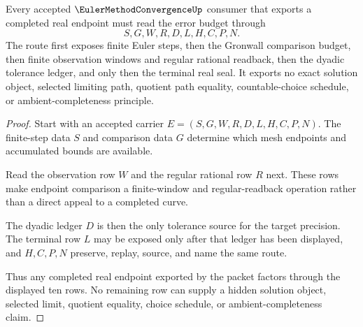 \begin{theorem}
\label{thm:euler-method-convergence-error-budget-route}
Every accepted $\EulerMethodConvergenceUp$ consumer that exports a completed real endpoint must read the error budget through
$$
S,G,W,R,D,L,H,C,P,N.
$$
The route first exposes finite Euler steps, then the Gronwall comparison budget, then finite observation windows and regular rational readback, then the dyadic tolerance ledger, and only then the terminal real seal. It exports no exact solution object, selected limiting path, quotient path equality, countable-choice schedule, or ambient-completeness principle.
\end{theorem}
\begin{proof}
Start with an accepted carrier $E=(S,G,W,R,D,L,H,C,P,N)$. The finite-step data $S$ and comparison data $G$ determine which mesh endpoints and accumulated bounds are available.

Read the observation row $W$ and the regular rational row $R$ next. These rows make endpoint comparison a finite-window and regular-readback operation rather than a direct appeal to a completed curve.

The dyadic ledger $D$ is then the only tolerance source for the target precision. The terminal row $L$ may be exposed only after that ledger has been displayed, and $H,C,P,N$ preserve, replay, source, and name the same route.

Thus any completed real endpoint exported by the packet factors through the displayed ten rows. No remaining row can supply a hidden solution object, selected limit, quotient equality, choice schedule, or ambient-completeness claim.
\end{proof}



